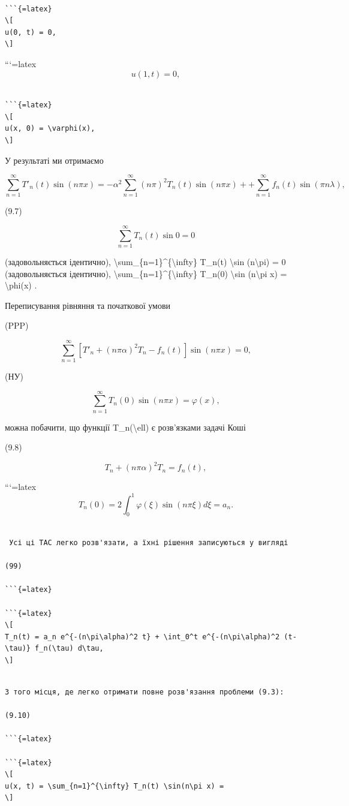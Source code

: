 \documentclass[
]{article}
\begin{document}
\begin{verbatim}

```{=latex}
\[
u(0, t) = 0,
\]
\end{verbatim}

```{=latex}
\[
u(1, t) = 0,
\]

\begin{verbatim}

```{=latex}
\[
u(x, 0) = \varphi(x),
\]
\end{verbatim}

У результаті ми отримаємо

\[
\sum_{n=1}^{\infty} T'_n(t) \sin(n\pi x) = -\alpha^2 \sum_{n=1}^{\infty} (n\pi)^2 T_n(t) \sin(n\pi x) + + \sum_{n=1}^{\infty} f_n(t) \sin(\pi n\lambda),
\]

(9.7)

\[
\sum_{n=1}^{\infty} T_n(t) \sin 0 = 0
\]

(задовольняється ідентично),
\textbackslash sum\_\{n=1\}\^{}\{\textbackslash infty\} T\_n(t)
\textbackslash sin (n\textbackslash pi) = 0 (задовольняється ідентично),
\textbackslash sum\_\{n=1\}\^{}\{\textbackslash infty\} T\_n(0)
\textbackslash sin (n\textbackslash pi x) = \textbackslash phi(x) .

Переписування рівняння та початкової умови

(PPP)

\[
\sum_{n=1}^{\infty} [T'_n + (n\pi\alpha)^2 T_n - f_n(t)] \sin(n\pi x) = 0,
\]

(НУ)

\[
\sum_{n=1}^{\infty} T_n(0) \sin(n\pi x) = \varphi(x),
\]

можна побачити, що функції T\_n(\textbackslash ell) є розв'язками задачі
Коші

(9.8)

\[
T_{n} + (n\pi\alpha)^{2} T_{n} = f_{n}(t),
\]

```{=latex}
\[
T_{n}(0) = 2 \int_{0}^{1} \varphi(\xi) \sin(n\pi\xi) d\xi = a_{n}.
\]

\begin{verbatim}

 Усі ці TAC легко розв'язати, а їхні рішення записуються у вигляді

(99)

```{=latex}

```{=latex}
\[
T_n(t) = a_n e^{-(n\pi\alpha)^2 t} + \int_0^t e^{-(n\pi\alpha)^2 (t-\tau)} f_n(\tau) d\tau,
\]
\end{verbatim}

\begin{verbatim}

З того місця, де легко отримати повне розв'язання проблеми (9.3):

(9.10)

```{=latex}

```{=latex}
\[
u(x, t) = \sum_{n=1}^{\infty} T_n(t) \sin(n\pi x) =
\]
\end{verbatim}
\end{document}
